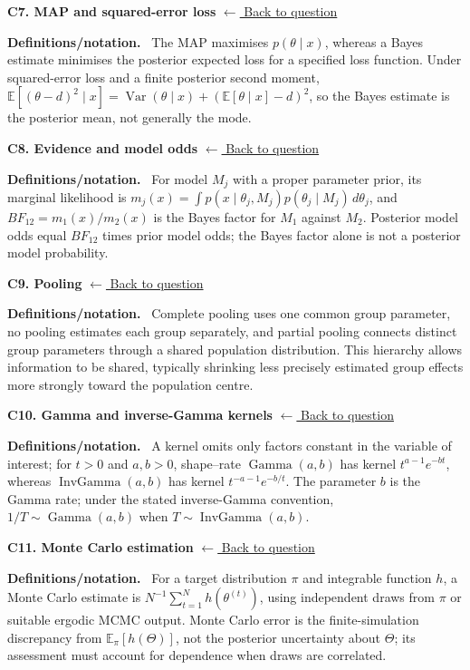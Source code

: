 \documentclass[11pt,a4paper]{article}
\DeclareMathOperator{\InvGamma}{InvGamma}
\newcommand{\E}{\mathbb{E}}
\newcommand{\concepttopic}[1]{%
  \par\addvspace{8pt}\noindent{\color{statblue}\bfseries #1}\par\nobreak\smallskip}
\newenvironment{conceptanswer}[2]
  {\par\addvspace{10pt}\noindent\begin{minipage}{\linewidth}%
   \hypertarget{concept-answer:#1}{}%
   \textcolor{statblue}{\textbf{C#1. #2}}\hfill%
   {\footnotesize\hyperlink{concept-question:#1}{$\leftarrow$ Back to question}}%
   \par\smallskip\textbf{Definitions/notation.}\ }
  {\end{minipage}\par}
\begin{document}
\begin{conceptanswer}{7}{MAP and squared-error loss}
The MAP maximises $p(\theta\mid x)$, whereas a Bayes estimate minimises the
posterior expected loss for a specified loss function.
Under squared-error loss and a finite posterior second moment,
$\E[(\theta-d)^2\mid x]=\operatorname{Var}(\theta\mid x)+(\E[\theta\mid x]-d)^2$,
so the Bayes estimate is the posterior mean, not generally the mode.
\end{conceptanswer}

\begin{conceptanswer}{8}{Evidence and model odds}
For model $M_j$ with a proper parameter prior, its marginal likelihood is
$m_j(x)=\int p(x\mid\theta_j,M_j)p(\theta_j\mid M_j)\,d\theta_j$,
and $BF_{12}=m_1(x)/m_2(x)$ is the Bayes factor for $M_1$ against $M_2$.
Posterior model odds equal $BF_{12}$ times prior model odds; the Bayes factor
alone is not a posterior model probability.
\end{conceptanswer}

\begin{conceptanswer}{9}{Pooling}
Complete pooling uses one common group parameter, no pooling estimates
each group separately, and partial pooling connects distinct group parameters
through a shared population distribution.
This hierarchy allows information to be shared, typically shrinking
less precisely estimated group effects more strongly toward the population
centre.
\end{conceptanswer}

\begin{conceptanswer}{10}{Gamma and inverse-Gamma kernels}
A kernel omits only factors constant in the variable of interest;
for $t>0$ and $a,b>0$, shape--rate $\operatorname{Gamma}(a,b)$ has kernel
$t^{a-1}e^{-bt}$, whereas $\InvGamma(a,b)$ has kernel
$t^{-a-1}e^{-b/t}$.
The parameter $b$ is the Gamma rate; under the stated inverse-Gamma convention,
$1/T\sim\operatorname{Gamma}(a,b)$ when $T\sim\InvGamma(a,b)$.
\end{conceptanswer}

\concepttopic{Monte Carlo and MCMC}
\begin{conceptanswer}{11}{Monte Carlo estimation}
For a target distribution $\pi$ and integrable function $h$, a Monte Carlo
estimate is $N^{-1}\sum_{t=1}^N h(\theta^{(t)})$, using independent draws
from $\pi$ or suitable ergodic MCMC output.
Monte Carlo error is the finite-simulation discrepancy from
$\E_\pi[h(\Theta)]$, not the posterior uncertainty about $\Theta$;
its assessment must account for dependence when draws are correlated.
\end{conceptanswer}
\end{document}
